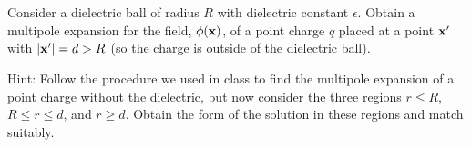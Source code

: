 \documentclass[11pt]{article}
\newenvironment{statement}[1]
{
	\section{#1}
	\color{darkgray}
	\ignorespaces
}
{
}
\begin{document}
\newcommand{\eps}{\epsilon}
\newcommand{\vx}{\vb{x}}
\newcommand{\phix}{\phi(\vx)}
\newcommand{\dcx}{\dd[3]{x}}
\newcommand{\dcxp}{\dd[3]{x'}}
\newcommand{\rhox}{\rho(\vx)}
\newcommand{\rhoxp}{\rho(\vx')}
\newcommand{\rhopxp}{\rho'(\vx')}
\newcommand{\xh}{\vec{\hat{x}}}
\newcommand{\absx}{\abs{\vx}}
\newcommand{\absxp}{\abs{\vx'}}

\newcommand{\Ylm}{Y_{l m}}
\newcommand{\qlm}{q_{l m}}
\newcommand{\Plm}{P_l^m}
\newcommand{\tht}{\theta}
\newcommand{\cost}{\cos\tht}
\newcommand{\vph}{\varphi}
\newcommand{\tv}{(\tht, \vph)}
\newcommand{\tvp}{(\tht', \vph')}
\newcommand{\Gxxp}{G(\vx, \vx')}
\newcommand{\Gpxxp}{G'(\vx, \vx')}
\newcommand{\Gdxxp}{G_D(\vx, \vx')}
\newcommand{\qplm}{q'_{l m}}

\newcommand{\lap}{\nabla^2}
\newcommand{\evphi}{\ev{\phi}}
\newcommand{\evphix}{\evphi\!(\vx)}
\newcommand{\rhof}{\rho_f}
\newcommand{\evrhof}{\ev{\rhof}}
\newcommand{\fe}{\frac{1}{\eps}}
\newcommand{\tif}{\text{if }}
\newcommand{\Al}{A_l}
\newcommand{\Bl}{B_l}
\newcommand{\Cl}{C_l}

\newcommand{\intoi}{\int_0^\infty}
\newcommand{\intono}{\int_{-1}^{1}}
\newcommand{\intotp}{\int_0^{2\pi}}
\newcommand{\drp}{\dd{r'}}
\newcommand{\dctp}{\dd{(\cost')}}
\newcommand{\dvp}{\dd{\vph'}}

\newcommand{\Ploq}{P_l^0(1)}
\newcommand{\Ylotv}{Y_{l 0}\tv}
\newcommand{\dr}{\dd{r}}
\newcommand{\dct}{\dd{(\cost)}}
\newcommand{\ddv}{\dd{\vph}}

\newcommand{\Alm}{A_{l m}}
\newcommand{\Blm}{B_{l m}}
\newcommand{\Ploct}{P_l^0(\cost)}
\newcommand{\alp}{\alpha}
\newcommand{\phirtp}{\phi(r, \tht, \phi}
\newcommand{\qlo}{q_{l 0}}
\newcommand{\qplo}{q'_{l 0}}

\newcommand{\vD}{\vb{D}}
\newcommand{\evD}{\ev{\vD}}
\newcommand{\nh}{\vb{\hat{n}}}
\newcommand{\vE}{\vb{E}}
\newcommand{\evE}{\ev{\vE}}
\newcommand{\Er}{E_r}
\newcommand{\evEr}{\ev{\Er}}

\begin{statement}{} \label{1}
	Consider a dielectric ball of radius $R$ with dielectric constant $\eps$.  Obtain a multipole expansion for the field, $\phix$, of a point charge $q$ placed at a point $\vx'$ with $\abs{\vx'} = d > R$ (so the charge is outside of the dielectric ball).
	
	Hint: Follow the procedure we used in class to find the multipole expansion of a point charge without the dielectric, but now consider the three regions $r \leq R$, $R \leq r \leq d$, and $r \geq d$.  Obtain the form of the solution in these regions and match suitably.
\end{statement}
\end{document}
